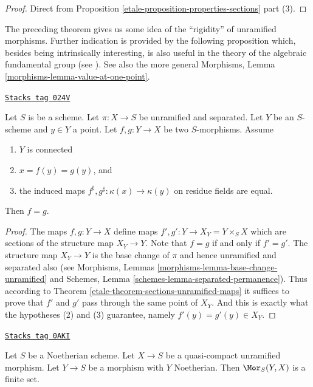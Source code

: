 \begin{proof}

Direct from Proposition \ref{etale-proposition-properties-sections} part (3).
\end{proof}

The preceding theorem gives us some idea of the ``rigidity'' of unramified
morphisms. Further indication is provided by the following proposition
which, besides being intrinsically interesting, is also useful in the
theory of the algebraic fundamental group (see \cite[Expos\'e V]{SGA1}).
See also the more general
Morphisms, Lemma \ref{morphisms-lemma-value-at-one-point}.

\begin{proposition}[Equality]
\label{etale-proposition-equality}
\href{https://stacks.math.columbia.edu/tag/024V}{\texttt{Stacks tag 024V}}

Let $S$ is be a scheme.
Let $\pi : X \to S$ be unramified and separated.
Let $Y$ be an $S$-scheme and $y \in Y$ a point.
Let $f, g : Y \to X$ be two $S$-morphisms. Assume
\begin{enumerate}
\item $Y$ is connected
\item $x = f(y) = g(y)$, and
\item the induced maps $f^\sharp, g^\sharp : \kappa(x) \to \kappa(y)$
on residue fields are equal.
\end{enumerate}
Then $f = g$.
\end{proposition}

\begin{proof}

The maps $f, g : Y \to X$ define maps $f', g' : Y \to X_Y = Y \times_S X$
which are sections of the structure map $X_Y \to Y$.
Note that $f = g$ if and only if $f' = g'$.
The structure map $X_Y \to Y$ is the base change of $\pi$ and hence
unramified and separated also (see
Morphisms, Lemmas \ref{morphisms-lemma-base-change-unramified} and
Schemes, Lemma \ref{schemes-lemma-separated-permanence}).
Thus according to Theorem \ref{etale-theorem-sections-unramified-maps}
it suffices to prove that $f'$ and $g'$ pass through the same
point of $X_Y$. And this is exactly what the hypotheses (2) and (3)
guarantee, namely $f'(y) = g'(y) \in X_Y$.
\end{proof}

\begin{lemma}
\label{etale-lemma-finitely-many-maps-to-unramified}
\href{https://stacks.math.columbia.edu/tag/0AKI}{\texttt{Stacks tag 0AKI}}

Let $S$ be a Noetherian scheme. Let $X \to S$ be a quasi-compact unramified
morphism. Let $Y \to S$ be a morphism with $Y$ Noetherian. Then
$\Mor_S(Y, X)$ is a finite set.
\end{lemma}

